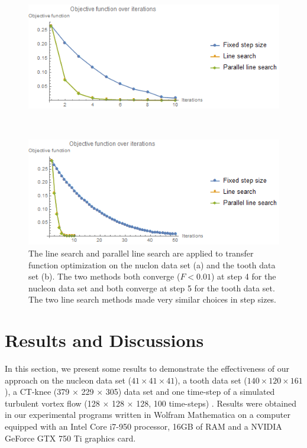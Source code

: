 \begin{figure}
	\centering
	\begin{minipage}{.49\textwidth}
		\includegraphics[width=1\linewidth]{images/nucleon_naive_rms_fixed_linesearch_parallel}
		\subcaption{}
	\end{minipage}~
	\begin{minipage}{.49\textwidth}
		\includegraphics[width=1\linewidth]{images/tooth_naive_rms_fixed_linesearch_parallel}
		\subcaption{}
	\end{minipage}
	\caption{The line search and parallel line search are applied to transfer function optimization on the nuclon data set (a) and the tooth data set (b). The two methods both converge ($F<0.01$) at step 4 for the nucleon data set and both converge at step 5 for the tooth data set. The two line search methods made very similar choices in step sizes.}
	\label{fig:nucleon_naive_tooth_naive_rms_linesearch}
\end{figure}

\section{Results and Discussions}
In this section, we present some results to demonstrate the effectiveness of our approach on the nucleon data set ($ 41 \times 41 \times 41 $), a tooth data set ($ 140 \times 120 \times 161 $), a CT-knee (379 $ \times $ 229 $ \times $ 305) data set \cite{website:Roettger_volume_2013} and one time-step of a simulated turbulent vortex flow (128 $\times$ 128 $\times$ 128, 100 time-steps) \cite{website:Ma_repository_2013}.
Results were obtained in our experimental programs written in Wolfram Mathematica on a computer equipped with an Intel Core i7-950 processor, 16GB of RAM and a NVIDIA GeForce GTX 750 Ti graphics card.

